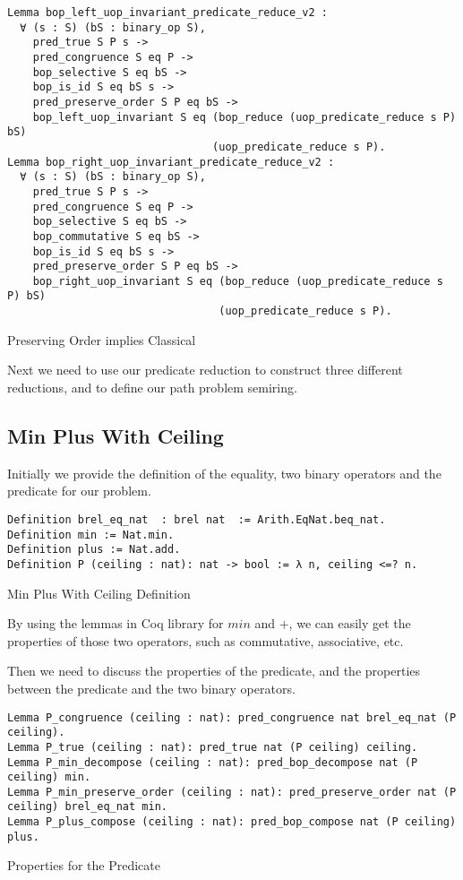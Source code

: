 \begin{listing}[H]
\begin{verbatim}
Lemma bop_left_uop_invariant_predicate_reduce_v2 :
  ∀ (s : S) (bS : binary_op S),
    pred_true S P s ->
    pred_congruence S eq P -> 
    bop_selective S eq bS ->
    bop_is_id S eq bS s ->        
    pred_preserve_order S P eq bS ->
    bop_left_uop_invariant S eq (bop_reduce (uop_predicate_reduce s P) bS) 
                                (uop_predicate_reduce s P).
Lemma bop_right_uop_invariant_predicate_reduce_v2 :
  ∀ (s : S) (bS : binary_op S),
    pred_true S P s ->
    pred_congruence S eq P -> 
    bop_selective S eq bS ->
    bop_commutative S eq bS ->
    bop_is_id S eq bS s ->        
    pred_preserve_order S P eq bS ->
    bop_right_uop_invariant S eq (bop_reduce (uop_predicate_reduce s P) bS) 
                                 (uop_predicate_reduce s P).
\end{verbatim}
\caption{Preserving Order implies Classical} 
\label{coq:proof:preserve_order_classic}
\end{listing}
Next we need to use our predicate reduction to construct three different reductions, and to define our path problem semiring.
\subsection{Min Plus With Ceiling}
Initially we provide the definition of the equality, two binary operators and the predicate for our problem.
\begin{listing}[H]
\begin{verbatim}
Definition brel_eq_nat  : brel nat  := Arith.EqNat.beq_nat.
Definition min := Nat.min.
Definition plus := Nat.add.
Definition P (ceiling : nat): nat -> bool := λ n, ceiling <=? n.
\end{verbatim}
\caption{Min Plus With Ceiling Definition} 
\label{coq:def:min_plus_with_ceiling}
\end{listing}

By using the lemmas in Coq library for $min$ and $+$, we can easily get the properties of those two operators, such as commutative, associative, etc.

Then we need to discuss the properties of the predicate, and the properties between the predicate and the two binary operators.
\begin{listing}[H]
\begin{verbatim}
Lemma P_congruence (ceiling : nat): pred_congruence nat brel_eq_nat (P ceiling).
Lemma P_true (ceiling : nat): pred_true nat (P ceiling) ceiling.
Lemma P_min_decompose (ceiling : nat): pred_bop_decompose nat (P ceiling) min.
Lemma P_min_preserve_order (ceiling : nat): pred_preserve_order nat (P ceiling) brel_eq_nat min.
Lemma P_plus_compose (ceiling : nat): pred_bop_compose nat (P ceiling) plus.
\end{verbatim}
\caption{Properties for the Predicate} 
\label{coq:proof:predicate_properties}
\end{listing}

